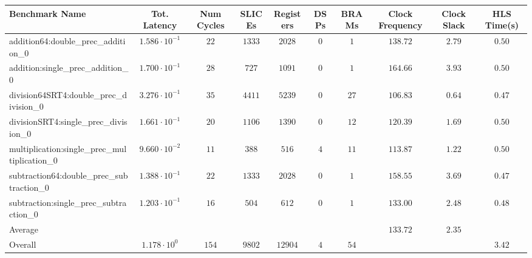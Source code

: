 \begin{tabular}{|l|c|c|c|c|c|c|c|c|c|}
\hline
Benchmark Name                                 & Tot. Latency            & Num Cycles & SLICEs   & Registers & DSPs  & BRAMs  & Clock Frequency & Clock Slack & HLS Time(s) \\
\hline
addition64:double\_prec\_addition\_0           & $ 1.586 \cdot 10^{-1} $ & $ 22     $ & $ 1333 $ & $ 2028  $ & $ 0 $ & $ 1  $ & $ 138.72      $ & $ 2.79    $ & $ 0.50    $ \\
addition:single\_prec\_addition\_0             & $ 1.700 \cdot 10^{-1} $ & $ 28     $ & $ 727  $ & $ 1091  $ & $ 0 $ & $ 1  $ & $ 164.66      $ & $ 3.93    $ & $ 0.50    $ \\
division64SRT4:double\_prec\_division\_0       & $ 3.276 \cdot 10^{-1} $ & $ 35     $ & $ 4411 $ & $ 5239  $ & $ 0 $ & $ 27 $ & $ 106.83      $ & $ 0.64    $ & $ 0.47    $ \\
divisionSRT4:single\_prec\_division\_0         & $ 1.661 \cdot 10^{-1} $ & $ 20     $ & $ 1106 $ & $ 1390  $ & $ 0 $ & $ 12 $ & $ 120.39      $ & $ 1.69    $ & $ 0.50    $ \\
multiplication:single\_prec\_multiplication\_0 & $ 9.660 \cdot 10^{-2} $ & $ 11     $ & $ 388  $ & $ 516   $ & $ 4 $ & $ 11 $ & $ 113.87      $ & $ 1.22    $ & $ 0.50    $ \\
subtraction64:double\_prec\_subtraction\_0     & $ 1.388 \cdot 10^{-1} $ & $ 22     $ & $ 1333 $ & $ 2028  $ & $ 0 $ & $ 1  $ & $ 158.55      $ & $ 3.69    $ & $ 0.47    $ \\
subtraction:single\_prec\_subtraction\_0       & $ 1.203 \cdot 10^{-1} $ & $ 16     $ & $ 504  $ & $ 612   $ & $ 0 $ & $ 1  $ & $ 133.00      $ & $ 2.48    $ & $ 0.48    $ \\
\hline
Average                                        & $                     $ & $        $ & $      $ & $       $ & $   $ & $    $ & $ 133.72      $ & $ 2.35    $ & $         $ \\
\hline
Overall                                        & $ 1.178 \cdot 10^{0}  $ & $ 154    $ & $ 9802 $ & $ 12904 $ & $ 4 $ & $ 54 $ & $             $ & $         $ & $ 3.42    $ \\
\hline
\end{tabular}

